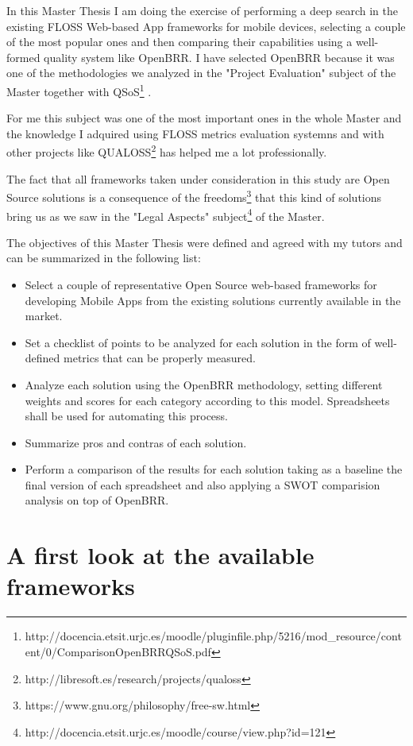 \documentclass[a4paper,12pt]{book}
\begin{document}
In this Master Thesis I am doing the exercise of performing a deep search in the existing FLOSS Web-based App frameworks for mobile devices, selecting a couple of the most popular ones and then comparing their capabilities using a well-formed quality system like OpenBRR. I have selected OpenBRR because it was one of the 
methodologies we analyzed in the "Project Evaluation" subject of the Master together with  QSoS\footnote{http://docencia.etsit.urjc.es/moodle/pluginfile.php/5216/mod\_resource/content/0/ComparisonOpenBRRQSoS.pdf} . 

For me this subject was one of the most important ones in the whole Master and the knowledge I adquired using FLOSS metrics evaluation systemns and with other projects like QUALOSS\footnote{http://libresoft.es/research/projects/qualoss} has helped me a lot professionally.

The fact that all frameworks taken under consideration in this study are Open Source solutions is a consequence of the freedoms\footnote{https://www.gnu.org/philosophy/free-sw.html} that this kind of solutions bring us as we saw in the "Legal Aspects" subject\footnote{http://docencia.etsit.urjc.es/moodle/course/view.php?id=121}  of the Master.

The objectives of this Master Thesis were defined and agreed with my tutors and can be summarized in the following list:

\begin{itemize}
\item Select a couple of representative Open Source web-based frameworks for developing Mobile Apps from the existing solutions currently available in the market.
\item Set a checklist of points to be analyzed for each solution in the form of well-defined metrics that can be properly measured.
\item Analyze each solution using the OpenBRR methodology, setting different weights and scores for each category according to this model. Spreadsheets shall be used for automating this process.
\item Summarize pros and contras of each solution.
\item Perform a comparison of the results for each solution taking as a baseline the final version of each spreadsheet and also applying a SWOT comparision analysis on top of OpenBRR.
\end{itemize}


\chapter{A first look at the available frameworks}
\label{chap:overview}
\end{document}
